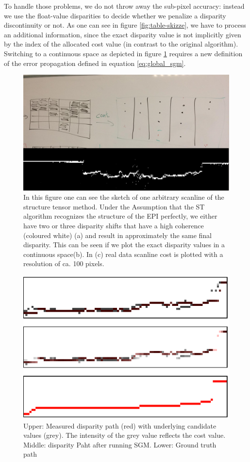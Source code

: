 \documentclass  [
  paper    = a4,
  BCOR     = 10mm,
  twoside,
  fontsize = 12pt,
  fleqn,
  toc      = bibnumbered,
  toc      = listofnumbered,
  numbers  = noendperiod,
  headings = normal,
  listof   = leveldown,
  version  = 3.03
]                                       {scrreprt}
\begin{document}
To handle those problems, we do not throw away the sub-pixel accuracy: instead we use the float-value disparities to decide whether we penalize a disparity discontinuity or not. As one can see in figure \ref{fig:table-skizze}, we have to process an additional information, since the exact disparity value is not implicitly given by the index of the allocated cost value (in contrast to the original algorithm). Switching to a continuous space as depicted in figure \ref{fig:discretecont} requires a new definition of the error propagation defined in equation \ref{eq:global_sgm}.
\begin{figure}
	\centering
	\includegraphics[width=0.7\linewidth]{images/discrete_cont}
	\caption[Discrete scanline to continuous scanline]{In this figure one can see the sketch of one arbitrary scanline of the structure tensor method. Under the Assumption that the ST algorithm recognizes the structure of the EPI perfectly, we either have two or three disparity shifts that have a high coherence (coloured white) (a) and result in approximately the same final disparity. This can be seen if we plot the exact disparity values in a continuous space(b). In (c) real data scanline cost is plotted with a resolution of ca. 100 pixels.}
	\label{fig:discretecont}
\end{figure}

\begin{figure}
	\centering
	\includegraphics[width=0.7\linewidth]{images/pens_paths}
	\caption[Different SGM Paths]{Upper: Measured disparity path (red) with underlying candidate values (grey). The intensity of the grey value reflects the cost value. Middle: disparity Paht after running SGM. Lower: Ground truth path}
	\label{fig:penspaths}
\end{figure}
\end{document}
